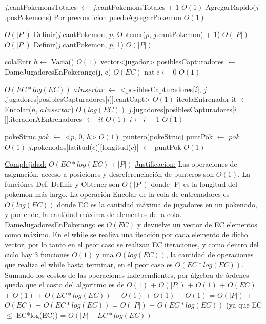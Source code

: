 \begin{Algoritmos}
\begin{algorithm}[H]
\begin{algorithmic}[1]
\State $j$.cantPokemonsTotales $\gets$ $j$.cantPokemonsTotales + 1 \Comment $O(1)$
\State AgregarRapido($j$.posPokemons) \Comment Por precondicion puedoAgregarPokemon $O(1)$

 \Comment $O(|P|)$
  \State Definir($j$.cantPokemon, $p$, Obtener($p$, $j$.cantPokemon) + 1) \Comment $O(|P|)$
\EndIf
{}  \Comment $O(|P|)$
  \State Definir($j$.cantPokemon, $p$, 1)  \Comment $O(|P|)$
\EndIf

\State colaEntr $h \gets$ Vacia() \Comment $O(1)$
\State vector<jugador> \hspace{0.5mm} posiblesCapturadores $\gets$ DameJugadoresEnPokerango(j, c) \Comment $O(EC)$
\State nat $i \gets$ 0 \Comment $O(1)$

 \Comment $O(EC*log(EC))$
  \State $aInsertar$ $\gets$ <posiblesCapturadores[$i$], $j$.jugadores[posiblesCapturadores[$i$]].cantCapt> \Comment $O(1)$
  \State itcolaEntrenador it $\gets$ Encolar($h$, $aInsertar$) \Comment $O(log(EC))$
  \State $j$.jugadores[posiblesCapturadores[$i$]].iteradorAEntrenadores $\gets$ $it$ \Comment $O(1)$
  \State $i \gets i$ + 1 \Comment $O(1)$
\EndWhile

\State pokeStruc $pok$ $\gets$ <$p$, 0, $h$> \Comment $O(1)$
\State puntero(pokeStruc) puntPok $\gets$ $pok$ \Comment $O(1)$
\State $j$.pokenodos[latitud($c$)][longitud($c$)] $\gets$ puntPok \Comment $O(1)$

\medskip
\State \underline{Complejidad:} $O(EC*log(EC) + |P|)$ 
\State \underline{Justificacion:} Las operaciones de asignaci\'on, acceso a posiciones y desreferenciaci\'on de punteros son $O(1)$. La funci\'ones Def, Definir y Obtener son $O(|P|)$ donde |P| es la longitud del pokemon m\'as largo. La operaci\'on Encolar de la cola de entrenadores es $O(log(EC))$ donde EC es la cantidad m\'axima de jugadores en un pokenodo, y por ende, la cantidad m\'axima de elementos de la cola. DameJugadoresEnPokerango es $O(EC)$ y devuelve un vector de EC elementos como m\'aximo. En el while se realiza una iteaci\'on por cada elemento de dicho vector, por lo tanto en el peor caso se realizan EC iteraciones, y como dentro del ciclo hay 3 funciones $O(1)$ y una $O(log(EC))$, la cantidad de operaciones que realiza el while hasta terminar, en el peor caso es $O(EC*log(EC))$. Sumando los costos de las operaciones independientes, por \'algebra de \'ordenes queda que el costo del algoritmo es de $O(1)$ + $O(|P|)$ + $O(1)$ + $O(EC)$ + $O(1)$ + $O(EC*log(EC))$ + $O(1)$ + $O(1)$ + $O(1)$ = $O(|P|)$ + $O(EC)$ + $O(EC*log(EC))$ = $O(|P|)$ + $O(EC*log(EC))$ (ya que EC $\leq$ EC*log(EC)) = $O(|P| + EC*log(EC))$


\end{algorithmic}
\end{algorithm}
\end{Algoritmos}
